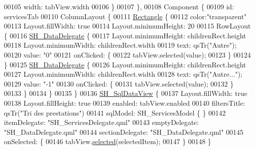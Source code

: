 \begin{DoxyCode}
00105                 width: tabView.width
00106             \}
00107         \},
00108         Component \{
00109             \textcolor{keywordtype}{id}: servicesTab
00110             ColumnLayout \{
00111                 \hyperlink{classRectangle}{Rectangle} \{
00112                     color:\textcolor{stringliteral}{"transparent"}
00113                     Layout.fillWidth: \textcolor{keyword}{true}
00114                     Layout.minimumHeight: 20
00115                     RowLayout \{
00116                         \hyperlink{classSH__DataDelegate}{SH\_DataDelegate} \{
00117                             Layout.minimumHeight: childrenRect.height
00118                             Layout.minimumWidth: childrenRect.width
00119                             text: qsTr(\textcolor{stringliteral}{"Autre"});
00120                             value: \textcolor{stringliteral}{"0"}
00121                             onClicked: \{
00122                                 tabView.selected(value);
00123                             \}
00124                         \}
00125                         \hyperlink{classSH__DataDelegate}{SH\_DataDelegate} \{
00126                             Layout.minimumHeight: childrenRect.height
00127                             Layout.minimumWidth: childrenRect.width
00128                             text: qsTr(\textcolor{stringliteral}{"Autre..."});
00129                             value: \textcolor{stringliteral}{"-1"}
00130                             onClicked: \{
00131                                 tabView.selected(value);
00132                             \}
00133                         \}
00134                     \}
00135                 \}
00136                 \hyperlink{classSH__SqlDataView}{SH\_SqlDataView} \{
00137                     Layout.fillWidth: \textcolor{keyword}{true}
00138                     Layout.fillHeight: \textcolor{keyword}{true}
00139                     enabled: tabView.enabled
00140                     filtersTitle: qsTr(\textcolor{stringliteral}{"Tri des prestations"})
00141                     sqlModel: SH\_ServicesModel \{ \}
00142                     itemDelegate: \textcolor{stringliteral}{"SH\_ServicesDelegate.qml"}
00143                     emptyDelegate: \textcolor{stringliteral}{"SH\_DataDelegate.qml"}
00144                     sectionDelegate: \textcolor{stringliteral}{"SH\_DataDelegate.qml"}
00145                     onSelected: \{
00146                         tabView.\hyperlink{classSH__SqlDataView_a95366e3f65b183e8c82381e90b5ddc94}{selected}(selectedItem);
00147                     \}
00148                 \}

\end{DoxyCode}

